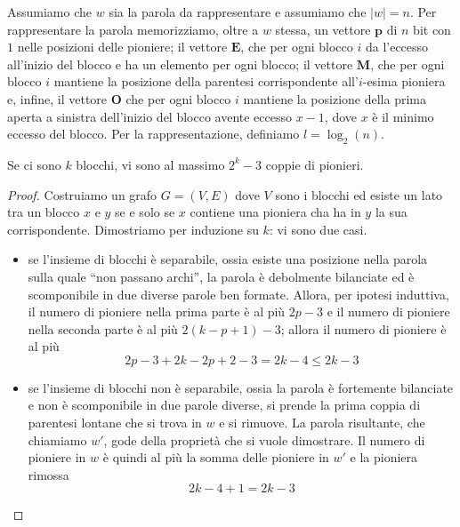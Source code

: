 Assumiamo che $w$ sia la parola da rappresentare e assumiamo che $|w| = n$.
Per rappresentare la parola memorizziamo, oltre a $w$ stessa, un vettore $\mathbf{p}$ di $n$ bit
con $1$ nelle posizioni delle pioniere; il vettore $\mathbf{E}$, che per ogni blocco $i$
da l'eccesso all'inizio del blocco e ha un elemento per ogni blocco; il vettore $\mathbf{M}$, che per ogni
blocco $i$ mantiene la posizione della parentesi corrispondente all'$i$-esima pioniera e, infine, il vettore
$\mathbf{O}$ che per ogni blocco $i$ mantiene la posizione della prima aperta a sinistra dell'inizio del blocco
avente eccesso $x-1$, dove $x$ è il minimo eccesso del blocco. Per la rappresentazione, definiamo $l = \log_2(n)$.
\begin{theorem}
	Se ci sono $k$ blocchi, vi sono al massimo $2^k - 3$ coppie di pionieri.
\end{theorem}
\begin{proof}
	Costruiamo un grafo $G = (V, E)$ dove $V$ sono i blocchi ed esiste un lato tra un blocco $x$ e $y$ se
	e solo se $x$ contiene una pioniera cha ha in $y$ la sua corrispondente.
	Dimostriamo per induzione su $k$: vi sono due casi.
	\begin{itemize}
		\item se l'insieme di blocchi è separabile, ossia esiste una posizione nella parola sulla quale
		      ``non passano archi'', la parola è debolmente bilanciate ed è scomponibile in due diverse
		      parole ben formate. Allora, per ipotesi induttiva, il numero di pioniere nella prima
		      parte è al più $2p - 3$ e il numero di pioniere nella seconda parte è al più $2(k - p + 1) - 3$;
		      allora il numero di pioniere è al più
		      $$
			      2p - 3 + 2 k - 2p + 2 - 3 = 2k - 4 \leq 2k - 3
		      $$
		\item se l'insieme di blocchi non è separabile, ossia la parola è fortemente
		      bilanciate e non è scomponibile in due parole diverse, si prende la
		      prima coppia di parentesi lontane che si trova in $w$ e si rimuove. La parola risultante,
		      che chiamiamo $w'$, gode della proprietà che si vuole dimostrare. Il numero
		      di pioniere in $w$ è quindi al più la somma delle pioniere in $w'$ e la pioniera rimossa
		      $$
			      2k - 4  + 1 = 2k - 3
		      $$

	\end{itemize}
\end{proof}

